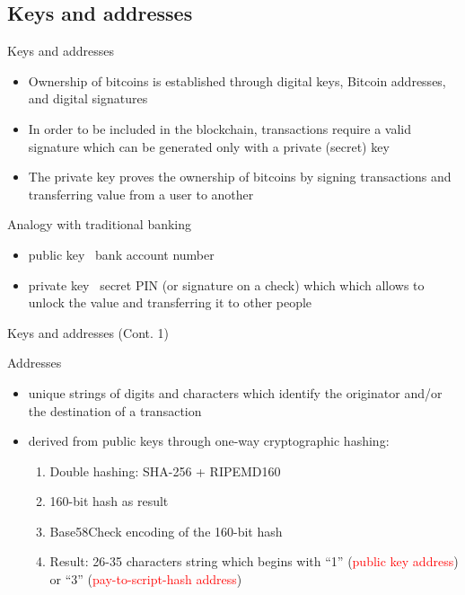 \documentclass{beamer}
\newcommand\red[1]{\textcolor{red}{#1}}
\begin{document}
  \subsection{Keys and addresses}
  \begin{frame}{Keys and addresses}
    \begin{itemize}
      \item Ownership of bitcoins is established through digital keys, Bitcoin addresses, and digital signatures \pause
      \item In order to be included in the blockchain, transactions require a valid
      signature which can be generated only with a private (secret) key \pause
      \item The private key proves the ownership of bitcoins by signing transactions and
      transferring value from a user to another \pause
    \end{itemize}
    \begin{block}{Analogy with traditional banking}
      \begin{itemize}
        \item public key \MVRightarrow\, bank account number
        \item private key \MVRightarrow\, secret PIN (or signature on a check)
        which which allows to unlock the value and transferring it to other people
      \end{itemize}
    \end{block}
  \end{frame}





  \begin{frame}{Keys and addresses (Cont. 1)}
    \begin{block}{Addresses}
      \begin{itemize}
        \item unique strings of digits and characters which identify the
        originator and/or the destination of a transaction \pause
        \item derived from public keys through one-way cryptographic hashing:
        \begin{enumerate}
          \item Double hashing: SHA-256 + RIPEMD160
          \item 160-bit hash as result
          \item Base58Check encoding of the 160-bit hash
          \item Result: 26-35 characters string which begins with “1” (\red{public key
          address}) or “3” (\red{pay-to-script-hash address})
        \end{enumerate}
      \end{itemize}
    \end{block}
  \end{frame}
\end{document}
